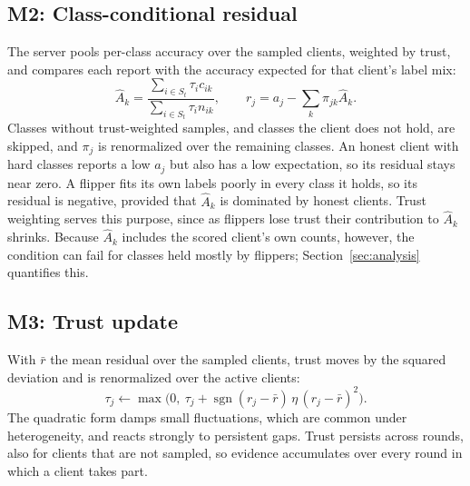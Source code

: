 \documentclass[journal]{IEEEtran}
\begin{document}
\subsection{M2: Class-conditional residual}
The server pools per-class accuracy over the sampled clients, weighted by trust, and compares each report with the accuracy expected for that client's label mix:
\begin{equation}
\hat A_k=\frac{\sum_{i\in S_t} \tau_i c_{ik}}{\sum_{i\in S_t} \tau_i n_{ik}},\qquad
r_j=a_j-\sum_k \pi_{jk}\hat A_k .
\label{eq:cr}
\end{equation}
Classes without trust-weighted samples, and classes the client does not hold, are skipped, and $\pi_j$ is renormalized over the remaining classes. An honest client with hard classes reports a low $a_j$ but also has a low expectation, so its residual stays near zero. A flipper fits its own labels poorly in every class it holds, so its residual is negative, provided that $\hat A_k$ is dominated by honest clients. Trust weighting serves this purpose, since as flippers lose trust their contribution to $\hat A_k$ shrinks. Because $\hat A_k$ includes the scored client's own counts, however, the condition can fail for classes held mostly by flippers; Section~\ref{sec:analysis} quantifies this.

\subsection{M3: Trust update}
With $\bar r$ the mean residual over the sampled clients, trust moves by the squared deviation and is renormalized over the active clients:
\begin{equation}
\tau_j \leftarrow \max\!\big(0,\ \tau_j + \operatorname{sgn}(r_j-\bar r)\,\eta\,(r_j-\bar r)^2\big).
\label{eq:trust}
\end{equation}
The quadratic form damps small fluctuations, which are common under heterogeneity, and reacts strongly to persistent gaps. Trust persists across rounds, also for clients that are not sampled, so evidence accumulates over every round in which a client takes part.
\end{document}
